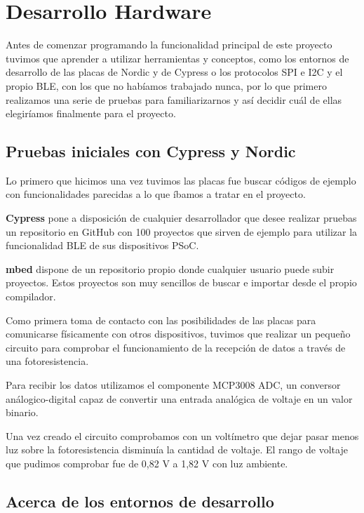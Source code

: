 
\cleardoublepage

\chapter{Desarrollo Hardware}
\label{makereference4}

Antes de comenzar programando la funcionalidad principal de este proyecto tuvimos que aprender a utilizar herramientas y conceptos, como los entornos de desarrollo de las placas de Nordic y de Cypress o los protocolos SPI e I2C y el propio BLE, con los que no habíamos trabajado nunca, por lo que primero realizamos una serie de pruebas para familiarizarnos y así decidir cuál de ellas elegiríamos finalmente para el proyecto.

\section{Pruebas iniciales con Cypress y Nordic}
\label{makereference4.1}

Lo primero que hicimos una vez tuvimos las placas fue buscar códigos de ejemplo con funcionalidades parecidas a lo que íbamos a tratar en el proyecto.

\textbf{Cypress} pone a disposición de cualquier desarrollador que desee realizar pruebas un repositorio en GitHub con 100 proyectos que sirven de ejemplo para utilizar la funcionalidad BLE de sus dispositivos PSoC.

\textbf{mbed} dispone de un repositorio propio donde cualquier usuario puede subir proyectos. Estos proyectos son muy sencillos de buscar e importar desde el propio compilador.

Como primera toma de contacto con las posibilidades de las placas para comunicarse físicamente con otros dispositivos, tuvimos que realizar un pequeño circuito para comprobar el funcionamiento de la recepción de datos a través de una fotoresistencia.

Para recibir los datos utilizamos el componente MCP3008 ADC, un conversor análogico-digital capaz de convertir una entrada analógica de voltaje en un valor binario.

Una vez creado el circuito comprobamos con un voltímetro que dejar pasar menos luz sobre la fotoresistencia disminuía la cantidad de voltaje. El rango de voltaje que pudimos comprobar fue de 0,82 V a 1,82 V con luz ambiente.


\section{Acerca de los entornos de desarrollo}
\label{makereference4.2}

